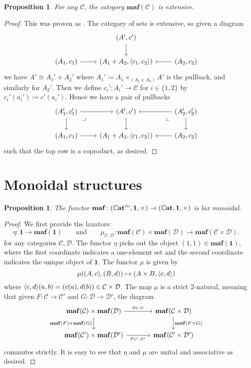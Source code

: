 \documentclass[11pt, one side, article]{memoir}
\theoremstyle{definition}
\theoremstyle{plain}
\newtheorem{proposition}[definitionx]{Proposition}
\DeclarePairedDelimiter{\pair}{\langle}{\rangle}
\newcommand{\cat}[1]{\mathcal{#1}}%
\newcommand{\Cat}[1]{\mathbf{#1}}%
\newcommand{\co}{^\tn{co}}
\newcommand{\tn}[1]{\textnormal{#1}}
\newcommand{\smcat}{\mathbb{C}\Cat{at}}
\newcommand{\0}{\Cat{0}}
\newcommand{\1}{\Cat{1}}
\newcommand{\opfam}{\Cat{maf}}
\newcommand{\qqand}{\qquad\text{and}\qquad}
\begin{document}
\begin{proposition}
For any $\cat{C}$, the category $\opfam(\cat{C})$ is extensive.
\end{proposition}
\begin{proof}
This was proven as \cite[Proposition 2.4]{carboni1993introduction}. The category of sets is extensive, so given a diagram
\[
\begin{tikzcd}
	&(A',c')\ar[d]\\
	(A_1,c_1)\ar[r]&(A_1+A_2,\pair{c_1,c_2})&(A_2,c_2)\ar[l]
\end{tikzcd}
\]
we have $A'\cong A_1'+A_2'$ where $A_1'\coloneqq A_1\times_{(A_1+A_2)}A'$ is the pullback, and similarly for $A_2'$. Then we define $c_i'\colon A_i'\to \cat{C}$ for $i\in\{1,2\}$ by $c_i'(a_i')\coloneqq c'(a_i')$.
 Hence we have a pair of pullbacks
\[
\begin{tikzcd}
	(A'_1,c'_1)\ar[r]\ar[d]\ar[dr, phantom, very near start, "\lrcorner"]&
	(A',c')\ar[d]&
	(A'_2,c'_2)\ar[l]\ar[d]\ar[dl, phantom, very near start, "\llcorner"]
	\\
	(A_1,c_1)\ar[r]&(A_1+A_2,\pair{c_1,c_2})&(A_2,c_2)\ar[l]
\end{tikzcd}
\]
such that the top row is a coproduct, as desired.
\end{proof}




\section{Monoidal structures}

\begin{proposition}
The functor $\opfam\colon(\smcat\co,\1,\times)\to(\smcat,\1,\times)$ is lax monoidal.
\end{proposition}
\begin{proof}
We first provide the laxators:
\[
  \eta\colon \1\to\opfam(\1)
  \qqand
  \mu_{\cat{C},\cat{D}}\colon\opfam(\cat{C})\times\opfam(\cat{D})\to\opfam(\cat{C}\times\cat{D}).
\]
for any categories $\cat{C},\cat{D}$. The functor $\eta$ picks out the object $(1,1)\in\opfam(\1)$, where the first coordinate indicates a one-element set and the second coordinate indicates the unique object of $\1$. The functor $\mu$ is given by
\[
\mu((A,c),(B,d))\mapsto(A\times B, \pair{c,d})
\]
where $\pair{c,d}(a,b)=(c(a),d(b))\in\cat{C}\times\cat{D}$. The map $\mu$ is a strict 2-natural, meaning that given $F\colon\cat{C}\to\cat{C}'$ and $G\colon\cat{D}\to\cat{D}'$, the diagram
\[
\begin{tikzcd}[column sep=large]
	\opfam(\cat{C})\times\opfam(\cat{D})\ar[r, "\mu_{\cat{C},\cat{D}}"]\ar[d, "\opfam(F)\times\opfam(G)"']&
	\opfam(\cat{C}\times\cat{D})\ar[d, "\opfam(F\times G)"]\\
	\opfam(\cat{C}')\times\opfam(\cat{D}')\ar[r, "\mu_{\cat{C'},\cat{D'}}"']&
	\opfam(\cat{C}'\times\cat{D}')
\end{tikzcd}
\]
commutes strictly. It is easy to see that $\eta$ and $\mu$ are unital and associative as desired.
\end{proof}
\end{document}
